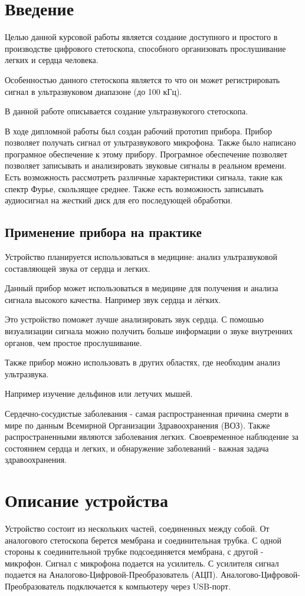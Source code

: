 \tableofcontents
\newpage 
\section{Введение}
Целью данной курсовой работы является создание доступного и простого в производстве цифрового стетоскопа, способного организовать прослушивание легких и сердца человека.

Особенностью данного стетоскопа является то что он может регистрировать сигнал в ультразвуковом диапазоне (до 100 кГц).

В данной работе описывается создание ультразвукогого стетоскопа.

В ходе дипломной работы был создан рабочий прототип прибора. Прибор позволяет получать сигнал от ультразвукового микрофона. Также было написано програмное обеспечение к этому прибору. Програмное обеспечение позволяет позволяет записывать и анализировать звуковые сигналы в реальном времени. Есть возможность рассмотреть различные характеристики сигнала, такие как спектр Фурье, скользящее среднее. Также есть возможность записывать аудиосигнал на жесткий диск для его последующей обработки.

\subsection{Применение прибора на практике}
Устройство планируется использоваться в медицине: анализ ультразвуковой составляющей звука от сердца и легких.

Данный прибор может использоваться в медицине для получения и анализа сигнала высокого качества. Например звук сердца и лёгких. 

Это устройство поможет лучше анализировать звук сердца. С помошью визуализации сигнала можно получить больше информации о звуке внутренних органов, чем простое прослушивание.

Также прибор можно использовать в других областях, где необходим анализ ультразвука. 

Например изучение дельфинов или летучих мышей. 

Сердечно-сосудистые заболевания - самая распространенная причина смерти в мире по данным Всемирной Организации Здравоохранения (ВОЗ). Также распространенными являются заболевания легких. Своевременное наблюдение за состоянием сердца и легких, и обнаружение заболеваний - важная задача здравоохранения.

\newpage  
\section{Описание устройства}
Устройство состоит из нескольких частей, соединенных между собой. От аналогового стетоскопа берется мембрана и соединительная трубка. С одной стороны к соединительной трубке подсоединяется мембрана, с другой - микрофон. Сигнал с микрофона подается на усилитель. С усилителя сигнал подается на Аналогово-Цифровой-Преобразователь (АЦП). Аналогово-Цифровой-Преобразователь подключается к компьютеру через USB-порт.

